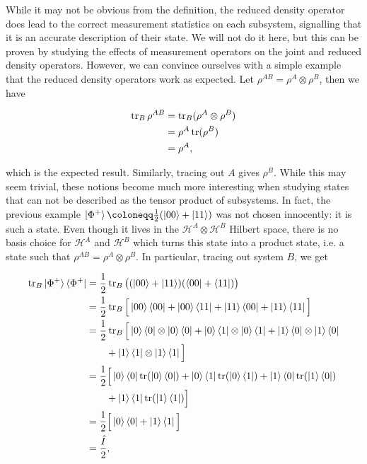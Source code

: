 While it may not be obvious from the definition, the reduced density operator does lead to the correct measurement statistics on each subsystem, signalling that it is an accurate description of their state. We will not do it here, but this can be proven by studying the effects of measurement operators on the joint and reduced density operators. However, we can convince ourselves with a simple example that the reduced density operators work as expected. Let $\rho^{AB} = \rho^A \otimes \rho^B$, then we have

\begin{align}
    \operatorname{tr}_B \rho^{AB} &= \operatorname{tr}_B (\rho^A \otimes \rho^B)\\
                    &= \rho^A \operatorname{tr}(\rho^B)\\
                    &= \rho^A,
\end{align}

\noindent which is the expected result. Similarly, tracing out $A$ gives $\rho^B$. While this may seem trivial, these notions become much more interesting when studying states that can not be described as the tensor product of subsystems. In fact, the previous example $\ket{\Phi^+} \coloneqq \frac{1}{2}(\ket{00} + \ket{11})$ was not chosen innocently: it is such a state. Even though it lives in the $\mathcal{H}^A \otimes \mathcal{H}^B$ Hilbert space, there is no basis choice for $\mathcal{H}^A$ and $\mathcal{H}^B$ which turns this state into a product state, i.e. a state such that $\rho^{AB} = \rho^A \otimes \rho^B$. In particular, tracing out system $B$, we get

\begin{align}
    \operatorname{tr}_B \ket{\Phi^+}\bra{\Phi^+} &= \frac{1}{2} \operatorname{tr}_B \big((\ket{00} + \ket{11})(\bra{00} + \bra{11})\big)\\
                                   &= \frac{1}{2} \operatorname{tr}_B \Big[\ket{00}\bra{00} + \ket{00}\bra{11} + \ket{11}\bra{00} + \ket{11}\bra{11}\Big]\\
                                   &= \frac{1}{2} \operatorname{tr}_B \Big[\ket{0}\bra{0} \otimes \ket{0}\bra{0} + \ket{0}\bra{1} \otimes \ket{0}\bra{1} + \ket{1}\bra{0} \otimes \ket{1}\bra{0}\nonumber\\
                                   &\quad \quad + \ket{1}\bra{1} \otimes \ket{1}\bra{1}\Big]\\
                                   &= \frac{1}{2} \Big[\ket{0}\bra{0}\operatorname{tr}(\ket{0}\bra{0}) + \ket{0}\bra{1}\operatorname{tr}(\ket{0}\bra{1}) + \ket{1}\bra{0}\operatorname{tr}(\ket{1}\bra{0}) \nonumber\\
                                   &\quad \quad + \ket{1}\bra{1}\operatorname{tr}(\ket{1}\bra{1})\Big]\\
                                   &= \frac{1}{2} \Big[\ket{0}\bra{0} + \ket{1}\bra{1}\Big]\\
                                   &= \frac{\hat{I}}{2},
\end{align}

